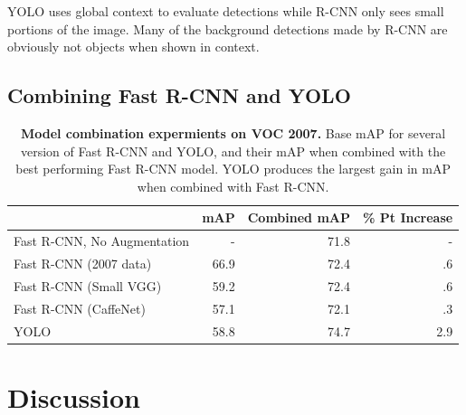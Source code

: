 \documentclass{article} %
\begin{document}
YOLO uses global context to evaluate detections while R-CNN only sees small portions of the image. Many of the background detections made by R-CNN are obviously not objects when shown in context.

\subsection{Combining Fast R-CNN and YOLO}



\begin{table}
\begin{center}
\begin{tabular}{lrrr}
 & mAP & Combined mAP & \% Pt Increase \\
\hline
Fast R-CNN, No Augmentation & - & 71.8 & - \\
\hline
Fast R-CNN (2007 data) & 66.9 & 72.4 & .6  \\
Fast R-CNN (Small VGG) & 59.2 & 72.4 & .6 \\
Fast R-CNN (CaffeNet) & 57.1  & 72.1 &  .3\\
YOLO & 58.8  & 74.7 & 2.9\\
\end{tabular}
\end{center}
\caption{\textbf{Model combination expermients on VOC 2007.} Base mAP for several version of Fast R-CNN and YOLO, and their mAP when combined with the best performing Fast R-CNN model. YOLO produces the largest gain in mAP when combined with Fast R-CNN.}
\end{table}

\section{Discussion}

{\small


}
\end{document}
